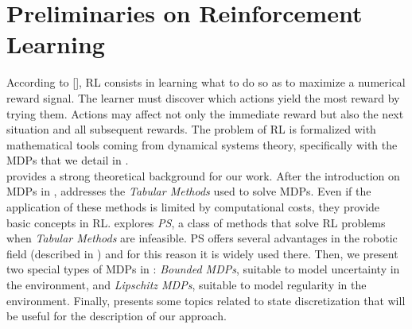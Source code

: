 \chapter{Preliminaries on Reinforcement Learning} \label{chap:rl}

According to [\cite{sutton2018reinforcement}], \acf{RL} consists in learning what to do so as to maximize a numerical reward signal. The learner must discover which actions yield the most reward by trying them. Actions may affect not only the immediate reward but also the next situation and all subsequent rewards. The problem of \ac{RL} is formalized with mathematical tools coming from dynamical systems theory, specifically with the \acf{MDPs} that we detail in .\\
\newline
{} provides a strong theoretical background for our work. After the introduction on \ac{MDPs} in ,  addresses the \emph{Tabular Methods} used to solve \ac{MDPs}. Even if the application of these methods is limited by computational costs, they provide basic concepts in \ac{RL}.  explores \emph{\acf{PS}}, a class of methods that solve \ac{RL} problems when \emph{Tabular Methods} are infeasible. \ac{PS} offers several advantages in the robotic field (described in ) and for this reason it is widely used there. Then, we present two special types of \ac{MDPs} in : \emph{Bounded \ac{MDPs}}, suitable to model uncertainty in the environment, and \emph{Lipschitz \ac{MDPs}}, suitable to model regularity in the environment. Finally,  presents some topics related to state discretization that will be useful for the description of our approach.

